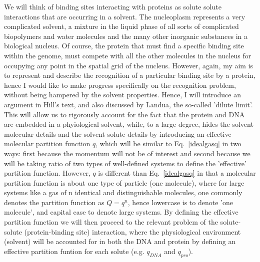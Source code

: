   We will think of binding sites interacting with proteins as solute solute interactions that are occurring in a solvent.  The nucleoplasm represents a very complicated solvent, a mixture in the liquid phase of all sorts of complicated biopolymers and water molecules and the many other inorganic substances in a biological nucleus.  Of course, the protein that must find a specific binding site within the genome, must compete with all the other molecules in the nucleus for occupying any point in the spatial grid of the nucleus.  However, again, my aim is to represent and describe the recognition of a particular binding site by a protein, hence I would like to make progress specifically on the recognition problem, without being hampered by the solvent properties.  Hence, I will introduce an argument in Hill's text\cite{hill}, and also discussed by Landua\cite{landaumech}, the so-called 'dilute limit'.  This will allow us to rigorously account for the fact that the protein and DNA are embedded in a phyiological solvent, while, to a large degree, hides the solvent molecular details and the solvent-solute details by introducing an effective molecular partition function $q$, which will be similar to Eq.~\ref{idealgasq} in two ways: first because the momentum will not be of interest and second because we will be taking ratio of two types of well-defined systems to define the 'effective' partition function.  However, $q$ is different than Eq.~\ref{idealgasq} in that a molecular partition function is about one type of particle (one molecule), where for large systems like a gas of n identical and distinguishable molecules, one commonly denotes the partition function as $Q=q^n$, hence lowercase is to denote 'one molecule', and capital case to denote large systems.  By defining the effective partition function we will then proceed to the relevant problem of the solute-solute (protein-binding site) interaction, where the physiological environment (solvent) will be accounted for in both the DNA and protein by defining an effective partition funtion for each solute (e.g. $q_{DNA}$ and $q_{pro}$).
 
